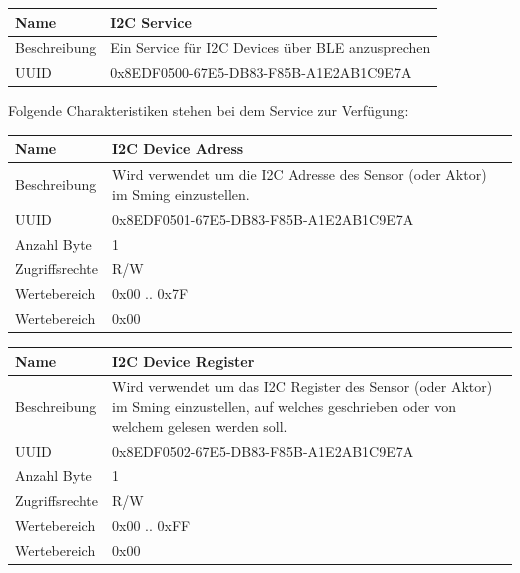 \begin{tabularx}{\textwidth}{|l|X|}
\hline
Name & I2C Service                                       \\
\hline
Beschreibung & Ein Service für I2C Devices über BLE anzusprechen \\
\hline
UUID	&    0x8EDF0500-67E5-DB83-F85B-A1E2AB1C9E7A  \\
\hline                                            
\end{tabularx}

Folgende Charakteristiken stehen bei dem Service zur Verfügung:

\begin{tabularx}{\textwidth}{|l|X|}
\hline
Name & I2C Device Adress                                   \\
\hline
Beschreibung & Wird verwendet um die I2C Adresse des Sensor (oder Aktor) im Sming einzustellen. \\
\hline
UUID	&    0x8EDF0501-67E5-DB83-F85B-A1E2AB1C9E7A  \\
\hline     
Anzahl Byte	&    1  \\
\hline      
Zugriffsrechte	&   R/W  \\
\hline        
Wertebereich	&   0x00 .. 0x7F \\
\hline          
Wertebereich	&   0x00 \\
\hline                                     
\end{tabularx}

\begin{tabularx}{\textwidth}{|l|X|}
\hline
Name & I2C Device Register                                  \\
\hline
Beschreibung & Wird verwendet um das I2C Register des Sensor (oder Aktor) im Sming einzustellen, auf welches geschrieben oder von welchem gelesen werden soll. \\
\hline
UUID	&    0x8EDF0502-67E5-DB83-F85B-A1E2AB1C9E7A  \\
\hline     
Anzahl Byte	&    1  \\
\hline      
Zugriffsrechte	&   R/W  \\
\hline        
Wertebereich	&   0x00 .. 0xFF \\
\hline          
Wertebereich	&   0x00 \\
\hline                                     
\end{tabularx}

